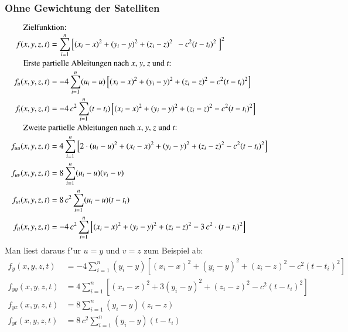 \begin{refsection}
\subsubsection{Ohne Gewichtung der Satelliten}
{
\parindent0pt
\begin{align*}
\noalign{Zielfunktion:}
f(x,y,z,t)&=
\sum_{i=1}^{n}
\left[(x_i-x)^2 + (y_i-y)^2 + (z_i-z)^2\;\, - c^2 (t-t_i)^2\;\right]^2
\\
\noalign{Erste partielle Ableitungen nach $x$, $y$, $z$ und $t$:}
f_u(x,y,z,t)
&=
-4\sum_{i=1}^{n}(u_i-u)\left[(x_i - x)^2 + (y_i - y)^2 + (z_i - z)^2 - c^2(t - t_i)^2 \right]
\\
f_t(x,y,z,t)
&=
-4 \,c^2\sum_{i=1}^{n}(t-t_i)\left[(x_i - x)^2 + (y_i - y)^2 + (z_i - z)^2 - c^2(t - t_i)^2\right]
\\
\noalign{Zweite partielle Ableitungen nach $x$, $y$, $z$ und $t$:}
f_{uu}(x,y,z,t)
&=
4\sum_{i=1}^{n} \left[ 2\cdot (u_i-u)^2+ (x_i - x)^2 + (y_i - y)^2 + (z_i - z)^2 - c^2(t - t_i)^2\right]
\\
f_{uv}(x,y,z,t)
&=
8\sum_{i=1}^{n}(u_i-u)(v_i-v)
\\
f_{ut}(x,y,z,t)
&=
8\,c^2\sum\limits_{i=1}^{n}(u_i-u)(t-t_i)
\\
f_{tt}(x,y,z,t)
&=
-4\,c^2\sum_{i=1}^{n}\left[(x_i - x)^2 + (y_i - y)^2 + (z_i - z)^2 - 3\,c^2\cdot(t - t_i)^2\right]
\end{align*}
}
Man liest daraus f"ur $u=y$ und $v=z$ zum Beispiel ab:
\allowdisplaybreaks
\begin{align*}
f_y(x,y,z,t)
&=
-4\sum_{i=1}^{n}(y_i-y)\left[(x_i - x)^2 + (y_i - y)^2 + (z_i - z)^2 - c^2(t - t_i)^2 \right]
\\
f_{yy}(x,y,z,t)
&=
4\sum_{i=1}^{n} \left[ (x_i - x)^2 + 3(y_i - y)^2 + (z_i - z)^2 - c^2(t - t_i)^2\right]
\\
f_{yz}(x,y,z,t)
&=
8\sum_{i=1}^{n}(y_i-y)(z_i-z)
\\
f_{yt}(x,y,z,t)
&=
8\,c^2\sum\limits_{i=1}^{n}(y_i-y)(t-t_i)
\end{align*}



\end{refsection}
